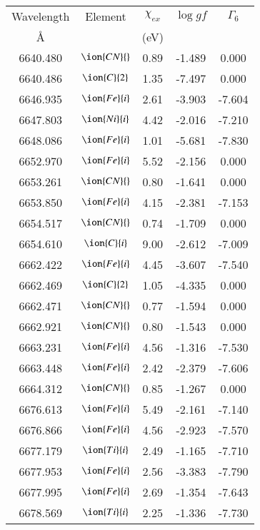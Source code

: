 \documentclass[fleqn,usenatbib]{mnras}
\begin{document}
\begin{center}
 \begin{table}
 \begin{tabular}{ccccc}
 \hline
 Wavelength & Element & $\chi_{ex}$ &  $\log gf$ & $\varGamma_{6}$ \\
   \AA{}    &         &  (eV)       &            &                 \\
 \hline
6640.480 & $\ion{CN}{}$ & 0.89 & -1.489 & 0.000 \\ 
6640.486 &  $\ion{C}{2}$ & 1.35 & -7.497 & 0.000 \\ 
6646.935 &  $\ion{Fe}{i}$  & 2.61 & -3.903 & -7.604 \\ 
6647.803 &  $\ion{Ni}{i}$  & 4.42 & -2.016 & -7.210 \\ 
6648.086 &  $\ion{Fe}{i}$  & 1.01 & -5.681 & -7.830 \\ 
6652.970 &  $\ion{Fe}{i}$  & 5.52 & -2.156 & 0.000 \\ 
6653.261 & $\ion{CN}{}$ & 0.80 & -1.641 & 0.000 \\ 
6653.850 &  $\ion{Fe}{i}$  & 4.15 & -2.381 & -7.153 \\ 
6654.517 & $\ion{CN}{}$ & 0.74 & -1.709 & 0.000 \\ 
6654.610 &  $\ion{C}{i}$  & 9.00 & -2.612 & -7.009 \\ 
6662.422 &  $\ion{Fe}{i}$  & 4.45 & -3.607 & -7.540 \\ 
6662.469 &  $\ion{C}{2}$ & 1.05 & -4.335 & 0.000 \\ 
6662.471 & $\ion{CN}{}$ & 0.77 & -1.594 & 0.000 \\ 
6662.921 & $\ion{CN}{}$ & 0.80 & -1.543 & 0.000 \\ 
6663.231 &  $\ion{Fe}{i}$  & 4.56 & -1.316 & -7.530 \\ 
6663.448 &  $\ion{Fe}{i}$  & 2.42 & -2.379 & -7.606 \\ 
6664.312 & $\ion{CN}{}$ & 0.85 & -1.267 & 0.000 \\ 
6676.613 &  $\ion{Fe}{i}$  & 5.49 & -2.161 & -7.140 \\ 
6676.866 &  $\ion{Fe}{i}$  & 4.56 & -2.923 & -7.570 \\ 
6677.179 &  $\ion{Ti}{i}$  & 2.49 & -1.165 & -7.710 \\ 
6677.953 &  $\ion{Fe}{i}$  & 2.56 & -3.383 & -7.790 \\ 
6677.995 &  $\ion{Fe}{i}$  & 2.69 & -1.354 & -7.643 \\ 
6678.569 &  $\ion{Ti}{i}$  & 2.25 & -1.336 & -7.730 \\ 

\end{tabular}
\end{table}
\end{center}
\end{document}
